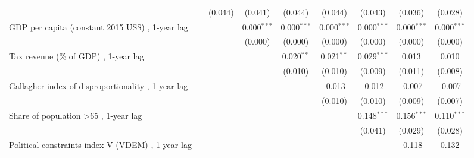 \begin{table}[htbp]
\begin{tabular}{lcccccccc}
                                                                                           &               & (0.044)        & (0.041)       & (0.044)       & (0.044)       & (0.043)       & (0.036)        & (0.028)\\   
      GDP per capita (constant 2015 US\$) , 1-year lag                                     &               &                & 0.000$^{***}$ & 0.000$^{***}$ & 0.000$^{***}$ & 0.000$^{***}$ & 0.000$^{***}$  & 0.000$^{***}$\\   
                                                                                           &               &                & (0.000)       & (0.000)       & (0.000)       & (0.000)       & (0.000)        & (0.000)\\   
      Tax revenue (\% of GDP) , 1-year lag                                                 &               &                &               & 0.020$^{**}$  & 0.021$^{**}$  & 0.029$^{***}$ & 0.013          & 0.010\\   
                                                                                           &               &                &               & (0.010)       & (0.010)       & (0.009)       & (0.011)        & (0.008)\\   
      Gallagher index of disproportionality , 1-year lag                                   &               &                &               &               & -0.013        & -0.012        & -0.007         & -0.007\\   
                                                                                           &               &                &               &               & (0.010)       & (0.010)       & (0.009)        & (0.007)\\   
      Share of population >65 , 1-year lag                                                 &               &                &               &               &               & 0.148$^{***}$ & 0.156$^{***}$  & 0.110$^{***}$\\   
                                                                                           &               &                &               &               &               & (0.041)       & (0.029)        & (0.028)\\   
      Political constraints index V (VDEM) , 1-year lag                                    &               &                &               &               &               &               & -0.118         & 0.132\\   

\end{tabular}
\end{table}
